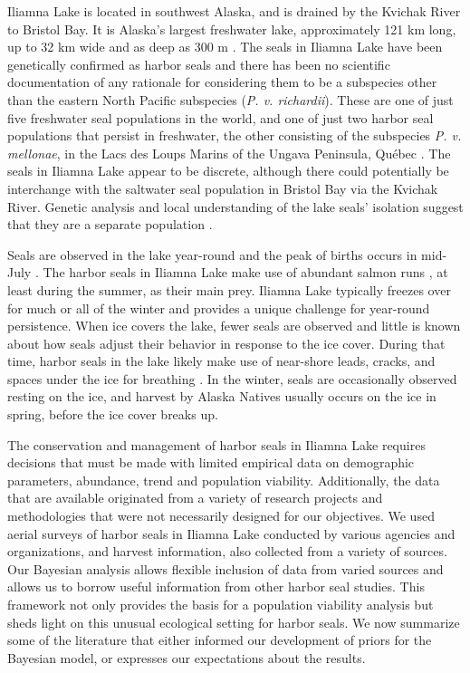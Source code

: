 \documentclass[]{risa}\usepackage[]{graphicx}\usepackage[]{color}
\begin{document}
Iliamna Lake is located in southwest Alaska, and is drained by the Kvichak River to Bristol Bay. It is Alaska's largest freshwater lake, approximately 121 km long, up to 32 km wide and as deep as 300 m \citep{Ande:bath:1969, Haus:Alle:Rich:Quin:resi:2008}.  The seals in Iliamna Lake have been genetically confirmed as harbor seals and there has been no scientific documentation of any rationale for considering them to be a subspecies other than the eastern North Pacific subspecies (\emph{P. v. richardii})\citep{Burn:Van:With:Hole:Asko:inte:2016}. These are one of just five freshwater seal populations in the world, and one of just two harbor seal populations that persist in freshwater, the other consisting of the subspecies \emph{P. v. mellonae}, in the Lacs des Loups Marins of the Ungava Peninsula, Qu\'{e}bec \citep{Smit:Hobs:Koop:Lavi:dist:1996}. The seals in Iliamna Lake appear to be discrete, although there could potentially be interchange with the saltwater seal population in Bristol Bay via the Kvichak River. Genetic analysis and local understanding of the lake seals' isolation suggest that they are a separate population \citep{Burn:Van:With:Hole:Asko:inte:2016,NMFS:enda:2016}.

Seals are observed in the lake year-round and the peak of births occurs in mid-July \citep{Burn:Van:With:Hole:Asko:inte:2016}. The harbor seals in Iliamna Lake make use of abundant salmon runs \citep{Haus:Alle:Rich:Quin:resi:2008}, at least during the summer, as their main prey. Iliamna Lake typically freezes over for much or all of the winter and provides a unique challenge for year-round persistence. When ice covers the lake, fewer seals are observed and little is known about how seals adjust their behavior in response to the ice cover. During that time, harbor seals in the lake likely make use of near-shore leads, cracks, and spaces under the ice for breathing \citep{Burn:Van:With:Hole:Asko:inte:2016}. In the winter, seals are occasionally observed resting on the ice, and harvest by Alaska Natives usually occurs on the ice in spring, before the ice cover breaks up.   

The conservation and management of harbor seals in Iliamna Lake requires decisions that must be made with limited empirical data on demographic parameters, abundance, trend and population viability. Additionally, the data that are available originated from a variety of research projects and methodologies that were not necessarily designed for our objectives. We used aerial surveys of harbor seals in Iliamna Lake conducted by various agencies and organizations, and harvest information, also collected from a variety of sources. Our Bayesian analysis allows flexible inclusion of data from varied sources and allows us to borrow useful information from other harbor seal studies. This framework not only provides the basis for a population viability analysis but sheds light on this unusual ecological setting for harbor seals. We now summarize some of the literature that either informed our development of priors for the Bayesian model, or expresses our expectations about the results.
\end{document}
